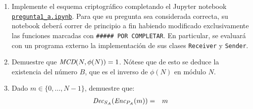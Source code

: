    \begin{enumerate}
\item Implemente el esquema criptográfico completando el Jupyter
  notebook
  \href{https://github.com/IIC3253/2023/blob/main/tareas/tarea\%202/enunciado/questions/p1/pregunta1_a.ipynb}{\texttt{pregunta1\_a.ipynb}}. Para
  que su pregunta sea considerada correcta, su notebook deberá correr
  de principio a fin habiendo modificado exclusivamente las funciones
  marcadas con \texttt{\#\#\#\#\# POR COMPLETAR}. En particular, se
  evaluará con un programa externo la implementación de sus clases
  \texttt{Receiver} y \texttt{Sender}.
  
  \item Demuestre que $\textit{MCD}(N, \phi(N)) = 1$. Nótese que de esto
    se deduce la existencia del número $B$, que es el inverso
    de $\phi(N)$ en módulo $N$.

\item Dado     $m \in \{0, \ldots, N-1\}$, demuestre que:
  \begin{eqnarray*}
    \textit{Dec}_{S_A}(\textit{Enc}_{P_A}(m)) &=& m
  \end{eqnarray*}
  \end{enumerate}
